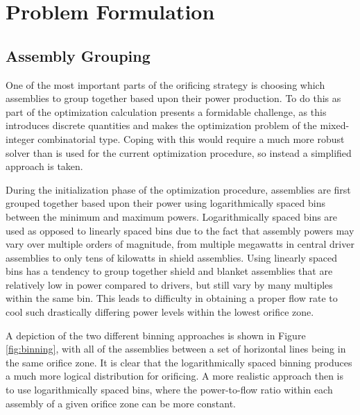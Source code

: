 \documentclass[11pt, oneside]{article}   	%
\begin{document}
\section{Problem Formulation}

\subsection{Assembly Grouping}

One of the most important parts of the orificing strategy is choosing which assemblies to group together based upon their power production.
To do this as part of the optimization calculation presents a formidable challenge, as this introduces discrete quantities and makes the optimization problem of the mixed-integer combinatorial type.
Coping with this would require a much more robust solver than is used for the current optimization procedure, so instead a simplified approach is taken.

During the initialization phase of the optimization procedure, assemblies are first grouped together based upon their power using logarithmically spaced bins between the minimum and maximum powers.
Logarithmically spaced bins are used as opposed to linearly spaced bins due to the fact that assembly powers may vary over multiple orders of magnitude, from multiple megawatts in central driver assemblies to only tens of kilowatts in shield assemblies. 
Using linearly spaced bins has a tendency to group together shield and blanket assemblies that are relatively low in power compared to drivers, but still vary by many multiples within the same bin.
This leads to difficulty in obtaining a proper flow rate to cool such drastically differing power levels within the lowest orifice zone.

A depiction of the two different binning approaches is shown in Figure \ref{fig:binning}, with all of the assemblies between a set of horizontal lines being in the same orifice zone.
It is clear that the logarithmically spaced binning produces a much more logical distribution for orificing.
A more realistic approach then is to use logarithmically spaced bins, where the power-to-flow ratio within each assembly of a given orifice zone can be more constant.
\end{document}
